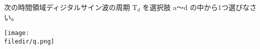 次の時間領域ディジタルサイン波の周期 $\textrm{T}_d$ を選択肢 a〜d の中から1つ選びなさい。

\centering\texttt{[image: \\filedir/q.png]}
